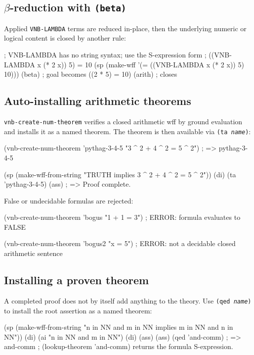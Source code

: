 \documentclass{amsbook}[openany]
\theoremstyle{definition}
\theoremstyle{remark}
\theoremstyle{remark}
\begin{document}
\subsection{$\beta$-reduction with \texttt{(beta)}}

Applied \texttt{VNB-LAMBDA} terms are reduced in-place, then the
underlying numeric or logical content is closed by another rule:

\begin{VNBcode}
; VNB-LAMBDA has no string syntax; use the S-expression form
; ((VNB-LAMBDA x (* 2 x)) 5) = 10
(sp (make-wff '(= ((VNB-LAMBDA x (* 2 x)) 5) 10)))
(beta)   ; goal becomes ((2 * 5) = 10)
(arith)  ; closes
\end{VNBcode}

\subsection{Auto-installing arithmetic theorems}

\texttt{vnb-create-num-theorem} verifies a closed arithmetic wff by
ground evaluation and installs it as a named theorem.  The theorem is
then available via \texttt{(ta \textit{name})}:

\begin{VNBcode}
(vnb-create-num-theorem 'pythag-3-4-5 "3 ^ 2 + 4 ^ 2 = 5 ^ 2")
; => pythag-3-4-5

(sp (make-wff-from-string "TRUTH implies 3 ^ 2 + 4 ^ 2 = 5 ^ 2"))
(di) (ta 'pythag-3-4-5) (ass)
; => Proof complete.
\end{VNBcode}

False or undecidable formulas are rejected:

\begin{VNBcode}
(vnb-create-num-theorem 'bogus "1 + 1 = 3")
; ERROR: formula evaluates to FALSE

(vnb-create-num-theorem 'bogus2 "x = 5")
; ERROR: not a decidable closed arithmetic sentence
\end{VNBcode}

\subsection{Installing a proven theorem}
\label{sec:qed-and-subst}

A completed proof does not by itself add anything to the theory.  Use
\texttt{(qed \textit{name})} to install the root assertion as a named
theorem:

\begin{VNBcode}
(sp (make-wff-from-string "n in NN and m in NN implies m in NN and n in NN"))
(di) (ai "n in NN and m in NN") (di) (ass) (ass)
(qed 'and-comm)
; => and-comm
; (lookup-theorem 'and-comm) returns the formula S-expression.
\end{VNBcode}
\end{document}
